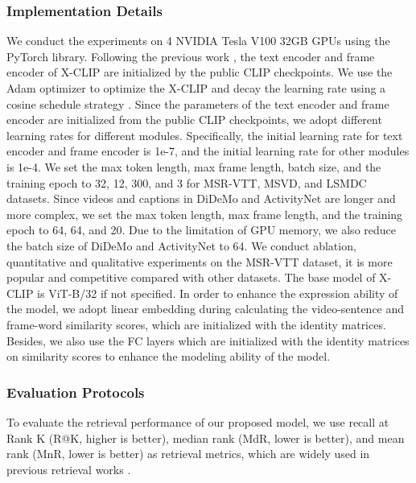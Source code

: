 \documentclass[sigconf]{acmart}
\begin{document}
\subsubsection{Implementation Details}
We conduct the experiments on 4 NVIDIA Tesla V100 32GB GPUs using the PyTorch library. Following the previous work \cite{luo2021clip4clip}, the text encoder and frame encoder of X-CLIP are initialized by the public CLIP checkpoints.  We use the Adam optimizer \cite{kingma2015adam} to optimize the X-CLIP and decay the learning rate using a cosine schedule strategy \cite{loshchilov2016sgdr}. Since the parameters of the text encoder and frame encoder are initialized from the public CLIP checkpoints, we adopt different learning rates for different modules. Specifically, the initial learning rate for text encoder and frame encoder is 1e-7, and the initial learning rate for other modules is 1e-4. We set the max token length, max frame length, batch size, and the training epoch to 32, 12, 300, and 3 for MSR-VTT, MSVD, and LSMDC datasets. Since videos and captions in DiDeMo and ActivityNet are longer and more complex, we set the max token length, max frame length, and the training epoch to 64, 64, and 20. Due to the limitation of GPU memory, we also reduce the batch size of DiDeMo and ActivityNet to 64. We conduct ablation, quantitative and qualitative experiments on the MSR-VTT dataset, it is more popular and competitive compared with other datasets. The base model of X-CLIP is ViT-B/32 if not specified. In order to enhance the expression ability of the model, we adopt linear embedding during calculating the video-sentence and frame-word similarity scores, which are initialized with the identity matrices. Besides, we also use the FC layers which are initialized with the identity matrices on similarity scores to enhance the modeling ability of the model.


\subsubsection{Evaluation Protocols}

To evaluate the retrieval performance of our proposed model, we use recall at Rank K (R@K, higher is better), median rank (MdR, lower is better), and mean rank (MnR, lower is better) as retrieval metrics, which are widely used in previous retrieval works \cite{yu2018joint,zhu2020actbert,lei2021less,liu2019use,gabeur2020multi,dzabraev2021mdmmt,mithun2018learning,zhang2018cross,liu2021hit,dong2019dual,bertasius2021space,arnab2021vivit,luo2021clip4clip}.
\end{document}
